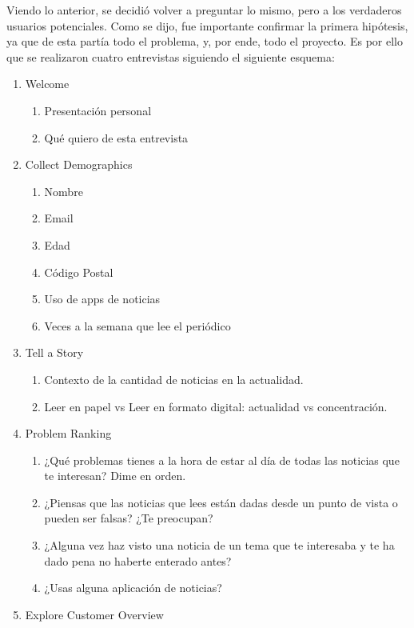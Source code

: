 Viendo lo anterior, se decidió volver a preguntar lo mismo, pero a los verdaderos usuarios potenciales. Como se dijo, fue importante confirmar la primera hipótesis, ya que de esta partía todo el problema, y, por ende, todo el proyecto. Es por ello que se realizaron cuatro entrevistas siguiendo el siguiente esquema:

\begin{enumerate}
    \item Welcome
    \begin{enumerate}
        \item Presentación personal
        \item Qué quiero de esta entrevista
    \end{enumerate}
    \item Collect Demographics
    \begin{enumerate}
        \item Nombre
        \item Email
        \item Edad
        \item Código Postal
        \item Uso de apps de noticias
        \item Veces a la semana que lee el periódico
    \end{enumerate}
    \item Tell a Story
    \begin{enumerate}
        \item Contexto de la cantidad de noticias en la actualidad.
        \item Leer en papel vs Leer en formato digital: actualidad vs concentración.
    \end{enumerate}
    \item Problem Ranking
    \begin{enumerate}
        \item ¿Qué problemas tienes a la hora de estar al día de todas las noticias que te interesan? Dime en orden.
        \item ¿Piensas que las noticias que lees están dadas desde un punto de vista o pueden ser falsas? ¿Te preocupan?
        \item ¿Alguna vez haz visto una noticia de un tema que te interesaba y te ha dado pena no haberte enterado antes?
        \item ¿Usas alguna aplicación de noticias?
    \end{enumerate}
    \item Explore Customer Overview

\end{enumerate}
